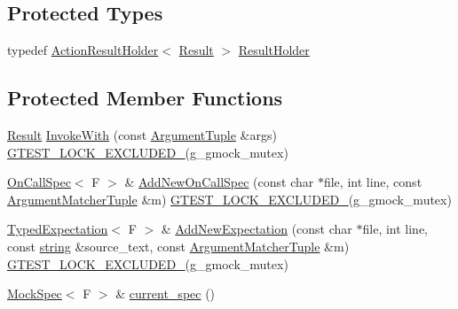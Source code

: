 \subsection*{Protected Types}
\begin{DoxyCompactItemize}
\item 
typedef \hyperlink{classtesting_1_1internal_1_1ActionResultHolder}{Action\+Result\+Holder}$<$ \hyperlink{classtesting_1_1internal_1_1FunctionMockerBase_aa50abc4055b4d3a14ad64c317bccec8d}{Result} $>$ \hyperlink{classtesting_1_1internal_1_1FunctionMockerBase_aa4e1b2ee217676c9e70c3006b19a8074}{Result\+Holder}
\end{DoxyCompactItemize}
\subsection*{Protected Member Functions}
\begin{DoxyCompactItemize}
\item 
\hyperlink{classtesting_1_1internal_1_1FunctionMockerBase_aa50abc4055b4d3a14ad64c317bccec8d}{Result} \hyperlink{classtesting_1_1internal_1_1FunctionMockerBase_a869ec713f000b4e7829c660efc25e8cd}{Invoke\+With} (const \hyperlink{classtesting_1_1internal_1_1FunctionMockerBase_a336432a07e544af4ffb8103603471ca3}{Argument\+Tuple} \&args) \hyperlink{gtest-port_8h_a69abff5a4efdd07bd5faebe3dd318d06}{G\+T\+E\+S\+T\+\_\+\+L\+O\+C\+K\+\_\+\+E\+X\+C\+L\+U\+D\+E\+D\+\_\+}(g\+\_\+gmock\+\_\+mutex)
\item 
\hyperlink{classtesting_1_1internal_1_1OnCallSpec}{On\+Call\+Spec}$<$ F $>$ \& \hyperlink{classtesting_1_1internal_1_1FunctionMockerBase_a22ece3b6e8d24f11d8f4ba9c17b737c4}{Add\+New\+On\+Call\+Spec} (const char $\ast$file, int line, const \hyperlink{classtesting_1_1internal_1_1FunctionMockerBase_ab790bcb1dcf57fa6659365386723ae5a}{Argument\+Matcher\+Tuple} \&m) \hyperlink{gtest-port_8h_a69abff5a4efdd07bd5faebe3dd318d06}{G\+T\+E\+S\+T\+\_\+\+L\+O\+C\+K\+\_\+\+E\+X\+C\+L\+U\+D\+E\+D\+\_\+}(g\+\_\+gmock\+\_\+mutex)
\item 
\hyperlink{classtesting_1_1internal_1_1TypedExpectation}{Typed\+Expectation}$<$ F $>$ \& \hyperlink{classtesting_1_1internal_1_1FunctionMockerBase_aa2c35c565f08d3649436af443ece468f}{Add\+New\+Expectation} (const char $\ast$file, int line, const \hyperlink{namespacetesting_1_1internal_a8e8ff5b11e64078831112677156cb111}{string} \&source\+\_\+text, const \hyperlink{classtesting_1_1internal_1_1FunctionMockerBase_ab790bcb1dcf57fa6659365386723ae5a}{Argument\+Matcher\+Tuple} \&m) \hyperlink{gtest-port_8h_a69abff5a4efdd07bd5faebe3dd318d06}{G\+T\+E\+S\+T\+\_\+\+L\+O\+C\+K\+\_\+\+E\+X\+C\+L\+U\+D\+E\+D\+\_\+}(g\+\_\+gmock\+\_\+mutex)
\item 
\hyperlink{classtesting_1_1internal_1_1MockSpec}{Mock\+Spec}$<$ F $>$ \& \hyperlink{classtesting_1_1internal_1_1FunctionMockerBase_a744318106e20b346f4f1efbf5a601644}{current\+\_\+spec} ()
\end{DoxyCompactItemize}
